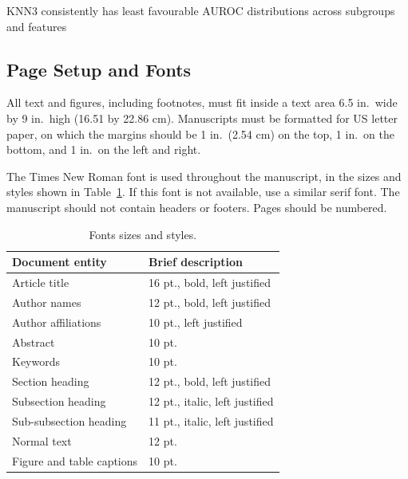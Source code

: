 \documentclass[12pt]{spieman}  %
\begin{document}
\begin{spacing}{2}
KNN3 consistently has least favourable AUROC distributions across subgroups and features

\subsection{Page Setup and Fonts}

All text and figures, including footnotes, must fit inside a text area 6.5 in.\ wide by 9 in.\ high (16.51 by 22.86 cm). Manuscripts must be formatted for US letter paper, on which the margins should be 1 in.\ (2.54 cm) on the top, 1 in.\ on the bottom, and 1 in.\ on the left and right.

The Times New Roman font is used throughout the manuscript, in the sizes and styles shown in Table~\ref{tab:fonts}. If this font is not available, use a similar serif font. The manuscript should not contain headers or footers. Pages should be numbered.

\begin{table}[ht]
\caption{Fonts sizes and styles.}
\label{tab:fonts}
\begin{center}
\begin{tabular}{|l|l|} %
\hline
\rule[-1ex]{0pt}{3.5ex}  Document entity & Brief description  \\
\hline\hline
\rule[-1ex]{0pt}{3.5ex}  Article title & 16 pt., bold, left justified  \\
\hline
\rule[-1ex]{0pt}{3.5ex}  Author names & 12 pt., bold, left justified   \\
\hline
\rule[-1ex]{0pt}{3.5ex}  Author affiliations & 10 pt., left justified   \\
\hline
\rule[-1ex]{0pt}{3.5ex}  Abstract & 10 pt.  \\
\hline
\rule[-1ex]{0pt}{3.5ex}  Keywords & 10 pt.  \\
\hline
\rule[-1ex]{0pt}{3.5ex}  Section heading & 12 pt., bold, left justified  \\
\hline
\rule[-1ex]{0pt}{3.5ex}  Subsection heading & 12 pt., italic, left justified  \\
\hline
\rule[-1ex]{0pt}{3.5ex}  Sub-subsection heading & 11 pt., italic, left justified  \\
\hline
\rule[-1ex]{0pt}{3.5ex}  Normal text & 12 pt. \\
\hline
\rule[-1ex]{0pt}{3.5ex}  Figure and table captions &  10 pt. \\
\hline
\end{tabular}
\end{center}
\end{table}


\end{spacing}
\end{document}

